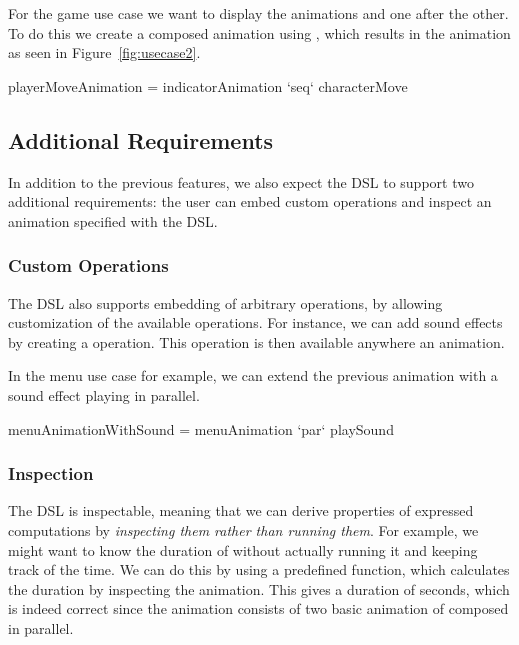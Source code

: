 For the game use case we want to display the animations  and  one after the other. To do this we create a composed animation using , which results in the animation as seen in Figure~\ref{fig:usecase2}.

\begin{spec}
playerMoveAnimation = indicatorAnimation `seq` characterMove
\end{spec}

\subsection{Additional Requirements}

In addition to the previous features, we also expect the DSL to support two additional requirements: the user can embed custom operations and inspect an animation specified with the DSL.

\subsubsection{Custom Operations}


The DSL also supports embedding of arbitrary operations, by allowing customization of the available operations. For instance, we can add sound effects by creating a  operation. This operation is then available anywhere an animation.

In the menu use case for example, we can extend the previous  animation with a sound effect playing in parallel.

\begin{spec}
menuAnimationWithSound = menuAnimation `par` playSound
\end{spec}

\subsubsection{Inspection}

The DSL is inspectable, meaning that we can derive properties of expressed computations by \emph{inspecting them rather than running them}. For example, we might want to know the duration of  without actually running it and keeping track of the time. We can do this by using a predefined  function, which calculates the duration by inspecting the animation. This gives a duration of  seconds, which is indeed correct since the animation consists of two basic animation of  composed in parallel.

